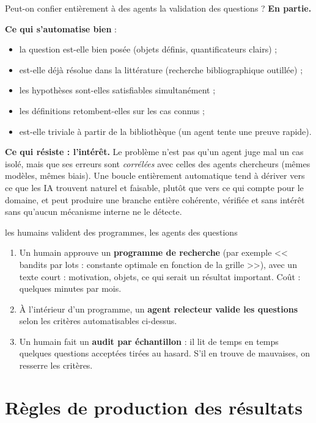 \documentclass[11pt,a4paper]{article}
\begin{document}
Peut-on confier entièrement à des agents la validation des questions ? \textbf{En partie.}

\textbf{Ce qui s'automatise bien} :
\begin{itemize}
\item la question est-elle bien posée (objets définis, quantificateurs clairs) ;
\item est-elle déjà résolue dans la littérature (recherche bibliographique outillée) ;
\item les hypothèses sont-elles satisfiables simultanément ;
\item les définitions retombent-elles sur les cas connus ;
\item est-elle triviale à partir de la bibliothèque (un agent tente une preuve rapide).
\end{itemize}

\textbf{Ce qui résiste : l'intérêt.} Le problème n'est pas qu'un agent juge mal un cas isolé, mais que
ses erreurs sont \emph{corrélées} avec celles des agents chercheurs (mêmes modèles, mêmes biais).
Une boucle entièrement automatique tend à dériver vers ce que les IA trouvent naturel et faisable,
plutôt que vers ce qui compte pour le domaine, et peut produire une branche entière cohérente,
vérifiée et sans intérêt sans qu'aucun mécanisme interne ne le détecte.

\begin{regle}{les humains valident des programmes, les agents des questions}
\begin{enumerate}
\item Un humain approuve un \textbf{programme de recherche} (par exemple << bandits par lots : constante
  optimale en fonction de la grille >>), avec un texte court : motivation, objets, ce qui serait
  un résultat important. Coût : quelques minutes par mois.
\item À l'intérieur d'un programme, un \textbf{agent relecteur valide les questions} selon les critères
  automatisables ci-dessus.
\item Un humain fait un \textbf{audit par échantillon} : il lit de temps en temps quelques questions
  acceptées tirées au hasard. S'il en trouve de mauvaises, on resserre les critères.
\end{enumerate}
\end{regle}

\section{Règles de production des résultats}
\end{document}
